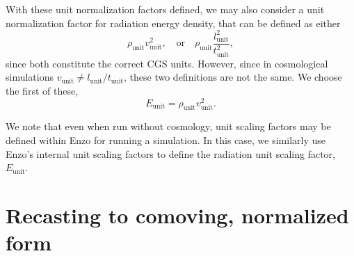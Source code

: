 \documentclass[10pt]{article}
\renewcommand{\(}{\left(}
\renewcommand{\)}{\right)}
\newcommand{\Lunit}{l_{\text{unit}}}
\newcommand{\Dunit}{\rho_{\text{unit}}}
\newcommand{\Tunit}{t_{\text{unit}}}
\newcommand{\Vunit}{v_{\text{unit}}}
\newcommand{\Eunit}{E_{\text{unit}}}
\begin{document}
With these unit normalization factors defined, we may also consider a
unit normalization factor for radiation energy density, that can be
defined as either 
\[
  \Dunit \Vunit^2, \quad\text{or}\quad 
  \Dunit \frac{\Lunit^2}{\Tunit^2},
\]
since both constitute the correct CGS units.  However, since in
cosmological simulations $\Vunit \ne \Lunit / \Tunit$, these two
definitions are not the same.  We choose the first of these,
\begin{equation}
  \label{eq:Eunit}
  \Eunit = \Dunit \Vunit^2.
\end{equation}

We note that even when run without cosmology, unit scaling factors may
be defined within Enzo for running a simulation.  In this case, we
similarly use Enzo's internal unit scaling factors to define the
radiation unit scaling factor, $\Eunit$. 





\section{Recasting to comoving, normalized form}
\label{sec:comoving_eqn}
\end{document}
